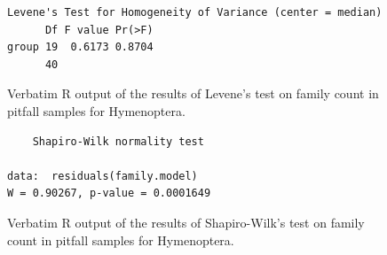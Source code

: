 \documentclass[10pt,letterpaper,twocolumn]{article}
\begin{document}
\begin{figure}[h]
	\lstset{numbers=left}
	\lstset{xleftmargin=5mm,framexleftmargin=5mm}
	\begin{lstlisting}
Levene's Test for Homogeneity of Variance (center = median)
      Df F value Pr(>F)
group 19  0.6173 0.8704
      40               
	\end{lstlisting}
	\caption{Verbatim R output of the results of Levene's test on family count in pitfall samples for Hymenoptera.}
	\label{fig:pitfall_hymenoptera_family_levene}
	\smallskip
	\nointerlineskip
	\hrulefill
\end{figure}

\begin{figure}[h]
	\lstset{numbers=left}
	\lstset{xleftmargin=5mm,framexleftmargin=5mm}
	\begin{lstlisting}
	Shapiro-Wilk normality test

data:  residuals(family.model)
W = 0.90267, p-value = 0.0001649
	\end{lstlisting}
	\caption{Verbatim R output of the results of Shapiro-Wilk's test on family count in pitfall samples for Hymenoptera.}
	\label{fig:pitfall_hymenoptera_family_shapiro}
	\smallskip
	\nointerlineskip
	\hrulefill
\end{figure}
\end{document}
